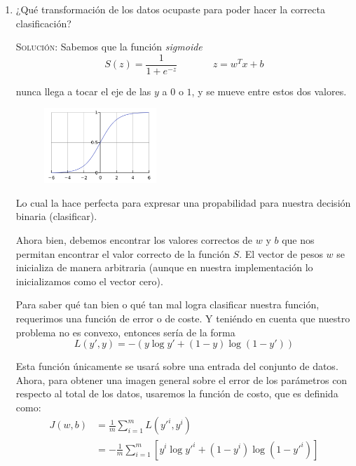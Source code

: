 \documentclass[letterpaper,11pt]{article}
\begin{document}
\begin{enumerate}
\begin{enumerate}
        \item ¿Qué transformación de los datos ocupaste para poder hacer la
        correcta clasificación?

        \textsc{Solución:} Sabemos que la función \textit{sigmoide} 
        \begin{equation*}
            S(z) = \frac{1}{1 + e^{-z}} \; \; \; \; \; \; \; \; \; \; \; \; \;
            z = w^{T} x + b
        \end{equation*}
        
        nunca llega a tocar el eje de las $y$ a $0$ o $1$, y se mueve entre 
        estos dos valores. 
        \begin{figure}[h]
            \centering
            \includegraphics[width=0.4\textwidth]{./imagenes/sigmoide.png}
        \end{figure} 
        
        Lo cual la hace perfecta para expresar una propabilidad para nuestra 
        decisión binaria (clasificar).

        Ahora bien, debemos encontrar los valores correctos de $w$ y $b$ que 
        nos permitan encontrar el valor correcto de la función $S$. El vector 
        de pesos $w$ se inicializa de manera arbitraria (aunque en nuestra 
        implementación lo inicializamos como el vector cero). 

        Para saber qué tan bien o qué tan mal logra clasificar nuestra función,
        requerimos una función de error o de coste. Y teniéndo en cuenta que 
        nuestro problema no es convexo, entonces sería de la forma 
        \begin{equation*}
            L(y', y) = - (y \log y' + (1 - y) \log (1 - y'))
        \end{equation*}

        Esta función únicamente se usará sobre una entrada del conjunto de 
        datos. Ahora, para obtener una imagen general sobre el error de los 
        parámetros con respecto al total de los datos, usaremos la función de 
        costo, que es definida como:
        \begin{align*}
            J(w, b) 
            &= \frac{1}{m} \sum_{i=1}^{m} L(y'^i, y^i) \\ 
            &= - \frac{1}{m} \sum_{i=1}^{m} [y^i \log y'^i + 
               (1 - y^i) \log (1 - y'^i)]
        \end{align*}


\end{enumerate}
\end{enumerate}
\end{document}
